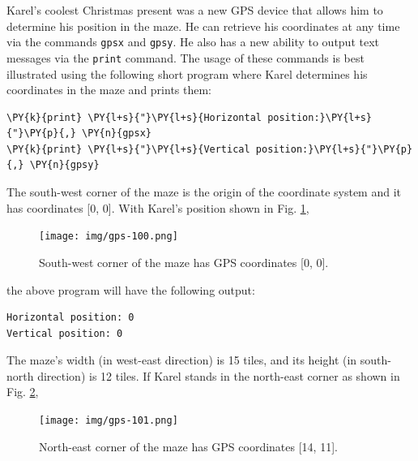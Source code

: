Karel's coolest Christmas present was a new GPS device that allows him to determine his position 
in the maze. He can retrieve his coordinates at any time via the 
commands {\tt gpsx} and {\tt gpsy}. He also has a new ability to output text messages via the {\tt print} 
command. The usage of these commands is best illustrated using the following short program where 
Karel determines his coordinates in the maze and prints them:\\

\begin{bbox}
\begin{Verbatim}[commandchars=\\\{\}]
\PY{k}{print} \PY{l+s}{"}\PY{l+s}{Horizontal position:}\PY{l+s}{"}\PY{p}{,} \PY{n}{gpsx}
\PY{k}{print} \PY{l+s}{"}\PY{l+s}{Vertical position:}\PY{l+s}{"}\PY{p}{,} \PY{n}{gpsy}
\end{Verbatim}
\end{bbox}
\vspace{6mm}

\noindent
The south-west corner of the maze is the origin of the coordinate system and it has 
coordinates [0, 0]. With Karel's position shown in Fig. \ref{fig:gps-100},
\newpage
\begin{figure}[!ht]
\begin{center}
\texttt{[image: img/gps-100.png]}
\vspace{-0mm}
\caption{South-west corner of the maze has GPS coordinates [0, 0].}
\vspace{-6mm}
\label{fig:gps-100}
\end{center}
\end{figure}
\noindent
the above program will have the following output:\\

\begin{ybox}
\begin{verbatim}
Horizontal position: 0
Vertical position: 0
\end{verbatim}
\end{ybox}
\vspace{6mm}

\noindent
The maze's width (in west-east direction) is 15 tiles, and its height (in south-north direction) 
is 12 tiles. If Karel stands in the north-east corner as shown in Fig. \ref{fig:gps-101},
\newpage
\begin{figure}[!ht]
\begin{center}
\texttt{[image: img/gps-101.png]}
\vspace{-0mm}
\caption{North-east corner of the maze has GPS coordinates [14, 11].}
\label{fig:gps-101}
\end{center}
\end{figure}

